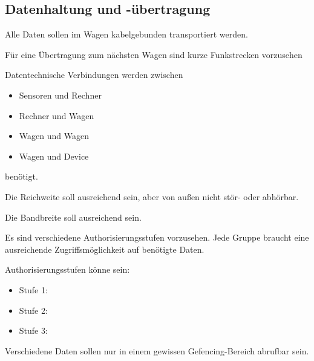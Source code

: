 \subsection{Datenhaltung und -übertragung}
\begin{feat}
Alle Daten sollen im Wagen kabelgebunden transportiert werden. 
\end{feat}
\begin{feat}
Für eine Übertragung zum nächsten Wagen sind kurze Funkstrecken vorzusehen
\end{feat}
\begin{feat}
Datentechnische Verbindungen werden zwischen 
\begin{itemize}
    \item Sensoren und Rechner
    \item Rechner und Wagen
    \item Wagen und Wagen
    \item Wagen und Device
\end{itemize}
benötigt.
\end{feat}
\begin{feat}
Die Reichweite soll ausreichend sein, aber von außen nicht stör- oder abhörbar.
\end{feat}
\begin{feat}
Die Bandbreite soll ausreichend sein.
\end{feat}
\begin{feat}
Es sind verschiedene Authorisierungsstufen vorzusehen. Jede Gruppe braucht eine ausreichende Zugriffsmöglichkeit auf benötigte Daten.
\end{feat}
\begin{rem}
Authorisierungsstufen könne sein:
\begin{itemize}
    \item Stufe 1:
    \item Stufe 2:
    \item Stufe 3:
\end{itemize}
\end{rem}
\begin{rem}
Verschiedene Daten sollen nur in einem gewissen Gefencing-Bereich abrufbar sein.
\end{rem}

